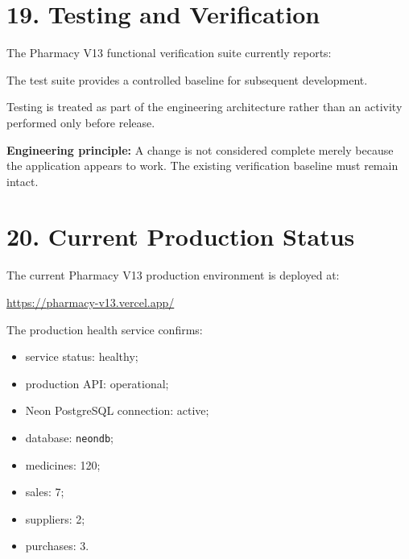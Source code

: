 \documentclass[12pt,a4paper]{article}
\begin{document}
\section*{19. Testing and Verification}

The Pharmacy V13 functional verification suite currently reports:

\begin{center}
\end{center}

The test suite provides a controlled baseline for subsequent development.

Testing is treated as part of the engineering architecture rather than an activity performed only before release.

\begin{notebox}
\textbf{Engineering principle:}
A change is not considered complete merely because the application appears to work. The existing verification baseline must remain intact.
\end{notebox}

\section*{20. Current Production Status}

The current Pharmacy V13 production environment is deployed at:

\begin{center}
\url{https://pharmacy-v13.vercel.app/}
\end{center}

The production health service confirms:

\begin{itemize}[leftmargin=1cm]
\item service status: healthy;
\item production API: operational;
\item Neon PostgreSQL connection: active;
\item database: \texttt{neondb};
\item medicines: 120;
\item sales: 7;
\item suppliers: 2;
\item purchases: 3.
\end{itemize}
\end{document}
